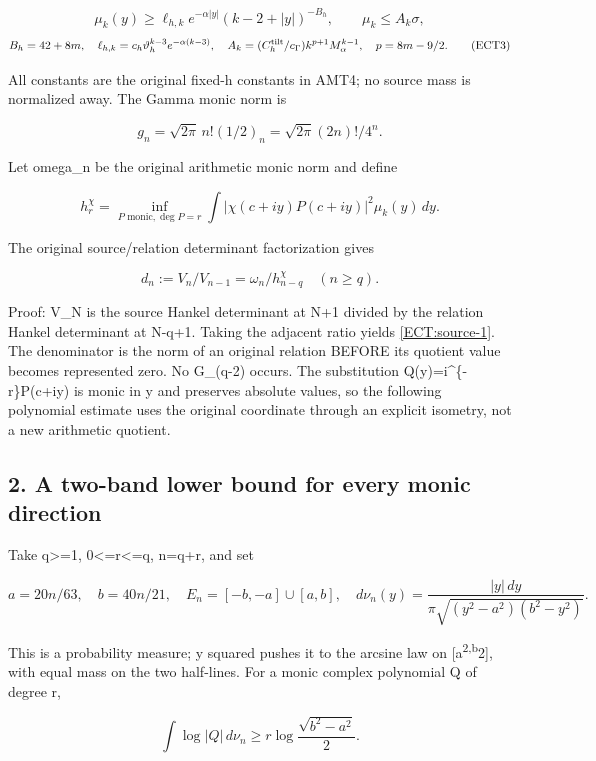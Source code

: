 \documentclass[11pt,a4paper]{article}
\begin{document}
\[
\mu_k(y)\ge\ell_{h,k}e^{-\alpha|y|}(k-2+|y|)^{-B_h},\qquad \mu_k\le A_k\sigma,
\tag{ECT2}\label{ECT:eq-2}\] \[
B_h=42+8m,\quad \ell_{h,k}=c_h\vartheta_h^{k-3}e^{-\alpha(k-3)},\quad
A_k=(C_h^{\rm tilt}/c_\Gamma)k^{p+1}M_\alpha^{k-1},\quad p=8m-9/2.
\tag{ECT3}\label{ECT:eq-3}\]

All constants are the original fixed-h constants in AMT4; no source mass is normalized away. The Gamma monic norm is

\[
g_n=\sqrt{2\pi}\,n!(1/2)_n=\sqrt{2\pi}(2n)!/4^n.
\tag{ECT4}\label{ECT:eq-4}\]

Let omega\_n be the original arithmetic monic norm and define

\[
h_r^\chi=\inf_{P\text{ monic},\deg P=r}\int|\chi(c+iy)P(c+iy)|^2\mu_k(y)\,dy.
\tag{ECT5}\label{ECT:eq-5}\]

The original source/relation determinant factorization gives

\[
\boxed{d_n:=V_n/V_{n-1}=\omega_n/h_{n-q}^\chi\quad(n\ge q).}
\tag{ECT6}\label{ECT:source-1}\]

Proof: V\_N is the source Hankel determinant at N+1 divided by the relation Hankel determinant at N-q+1. Taking the adjacent ratio yields \eqref{ECT:source-1}. The denominator is the norm of an original relation BEFORE its quotient value becomes represented zero. No G\_(q-2) occurs. The substitution Q(y)=i\^{}\{-r\}P(c+iy) is monic in y and preserves absolute values, so the following polynomial estimate uses the original coordinate through an explicit isometry, not a new arithmetic quotient.

\subsection{2. A two-band lower bound for every monic direction}\label{ECT:a-two-band-lower-bound-for-every-monic-direction}

Take q\textgreater=1, 0\textless=r\textless=q, n=q+r, and set

\[
a=20n/63,\quad b=40n/21,\quad E_n=[-b,-a]\cup[a,b],\quad
 d\nu_n(y)=\frac{|y|\,dy}{\pi\sqrt{(y^2-a^2)(b^2-y^2)}}.
\tag{ECT7}\label{ECT:eq-7}\]

This is a probability measure; y squared pushes it to the arcsine law on {[}a\textsuperscript{2,b}2{]}, with equal mass on the two half-lines. For a monic complex polynomial Q of degree r,

\[
\int\log|Q|\,d\nu_n\ge r\log\frac{\sqrt{b^2-a^2}}2.
\tag{ECT8}\label{ECT:source-2}\]
\end{document}
